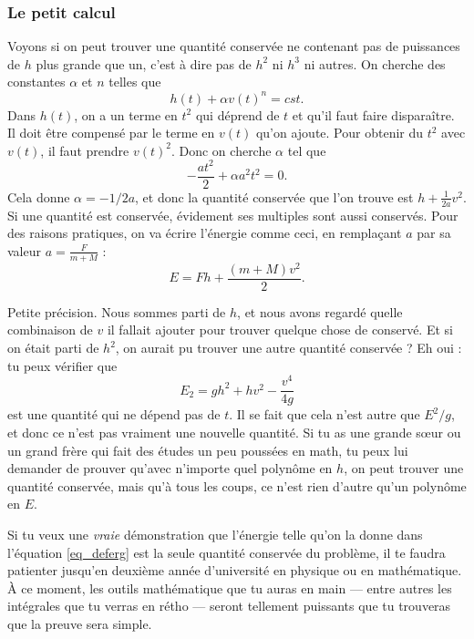\subsubsection{Le petit calcul}

Voyons si on peut trouver une quantité conservée ne contenant pas de puissances de $h$ plus grande que un, c'est à dire pas de $h^2$ ni $h^3$ ni autres. On cherche des constantes $\alpha$ et $n$ telles que
\[ 
  h(t)+\alpha v(t)^n=cst.
\]
Dans $h(t)$, on a un terme en $t^2$ qui déprend de $t$ et qu'il faut faire disparaître. Il doit être compensé par le terme en $v(t)$ qu'on ajoute. Pour obtenir du $t^2$ avec $v(t)$, il faut prendre $v(t)^2$. Donc on cherche $\alpha$ tel que
\[ 
  -\frac{ at^2 }{ 2 }+\alpha a^2t^2=0.
\]
Cela donne $\alpha=-1/2a$, et donc la quantité conservée que l'on trouve est $h+\frac{1}{ 2a }v^2$. Si une quantité est conservée, évidement ses multiples sont aussi conservés. Pour des raisons pratiques, on va écrire l'énergie comme ceci, en remplaçant $a$ par sa valeur $a=\frac{ F }{ m+M }$  :
\begin{equation}  \label{eq_deferg}
    E=Fh+\frac{ (m+M)v^2 }{ 2 }.
\end{equation}


\begin{enplus}
Petite précision. Nous sommes parti de $h$, et nous avons regardé quelle combinaison de $v$ il fallait ajouter pour trouver quelque chose de conservé. Et si on était parti de $h^2$, on aurait pu trouver une autre quantité conservée ? Eh oui : tu peux vérifier que
\[ 
  E_2=gh^2+hv^2-\frac{ v^4 }{ 4g }
\]
est une quantité qui ne dépend pas de $t$. Il se fait que cela n'est autre que $E^2/g$, et donc ce n'est pas vraiment une nouvelle quantité. Si tu as une grande s\oe ur ou un grand frère qui fait des études un peu poussées en math, tu peux lui demander de prouver qu'avec n'importe quel polynôme en $h$, on peut trouver une quantité conservée, mais qu'à tous les coups, ce n'est rien d'autre qu'un polynôme en $E$.

Si tu veux une \emph{vraie} démonstration que l'énergie telle qu'on la donne dans l'équation \eqref{eq_deferg}  est la seule quantité conservée du problème, il te faudra patienter jusqu'en deuxième année d'université en physique ou en mathématique. À ce moment, les outils mathématique que tu auras en main --- entre autres les intégrales que tu verras en rétho --- seront tellement puissants que tu trouveras que la preuve sera simple.

\end{enplus}
 
